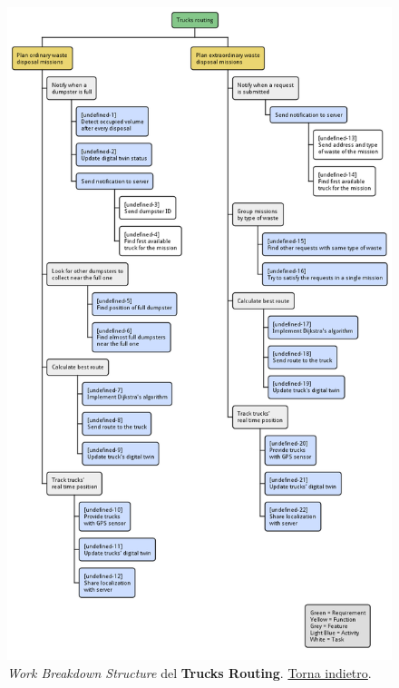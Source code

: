\begin{figure}[H]
    \centering
    \includegraphics[width=\textwidth]{uml/wbs-trucks-routing.pm}
    \caption{\textit{Work Breakdown Structure} del \textbf{Trucks Routing}. \hyperlink{back:uml/wbs-trucks-routing}{Torna indietro}.}
    \label{fig:uml/wbs-trucks-routing}
\end{figure}


